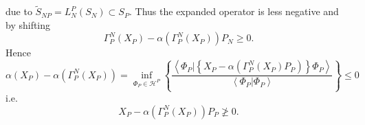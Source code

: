 \documentclass[aps,preprint]{revtex4}%
\begin{document}
due to $\tilde{S}_{NP}=L_{N}^{P}\left(  S_{N}\right)  \subset S_{P}$. Thus the
expanded operator is less negative and by shifting
\begin{equation}
\Gamma_{P}^{N}\left(  X_{P}\right)  -\alpha\left(  \Gamma_{P}^{N}\left(
X_{P}\right)  \right)  P_{N}\geq0.
\end{equation}
Hence
\begin{equation}
\alpha\left(  X_{P}\right)  -\alpha\left(  \Gamma_{P}^{N}\left(  X_{P}\right)
\right)  =\inf_{\Phi_{P}\in\mathcal{H}^{P}}\left\{  \frac{\left\langle \left.
\Phi_{P}\right\vert \left\{  X_{P}-\alpha\left(  \Gamma_{P}^{N}\left(
X_{P}\right)  P_{P}\right)  \right\}  \Phi_{P}\right\rangle }{\left\langle
\left.  \Phi_{P}\right\vert \Phi_{P}\right\rangle }\right\}  \leq0
\end{equation}
i.e.%
\begin{equation}
X_{P}-\alpha\left(  \Gamma_{P}^{N}\left(  X_{P}\right)  \right)  P_{P}\ngeq0.
\end{equation}
\end{document}
